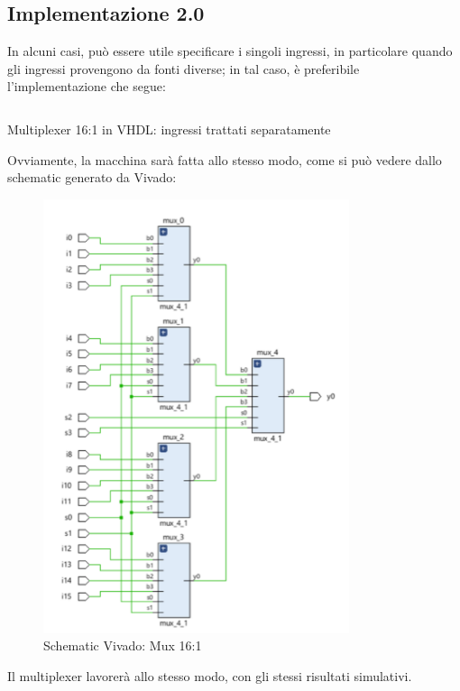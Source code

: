 \subsection{Implementazione 2.0}
In alcuni casi, può essere utile specificare i singoli ingressi, in particolare quando gli ingressi provengono da fonti diverse; in tal caso, è preferibile l'implementazione che segue:
\begin{code}
    \inputminted[frame=lines, framesep=2mm, baselinestretch=1.2, bgcolor=LightGray, fontsize=\footnotesize, linenos]{vhdl}{vhdl_files/mux16_1_singIng.vhd}
    \caption{Multiplexer 16:1 in VHDL: ingressi trattati separatamente}
    \label{lst:mux_16_1}
\end{code}
Ovviamente, la macchina sarà fatta allo stesso modo, come si può vedere dallo schematic generato da Vivado:
 \begin{figure}[H]
	\centering
	\includegraphics[width=0.8\textwidth]{img/mux16_1_vivado}
	\caption{Schematic Vivado: Mux 16:1}
	\label{Schematic Vivado: Mux 16:1} 
\end{figure}
Il multiplexer lavorerà allo stesso modo, con gli stessi risultati simulativi.


